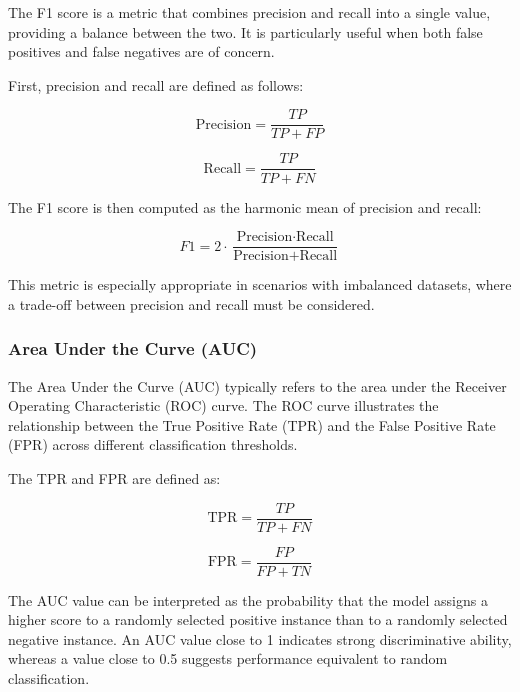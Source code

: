 \documentclass[ENG]{TFUOC}%
\begin{document}
The F1 score is a metric that combines precision and recall into a single value, providing a balance between the two. It is particularly useful when both false positives and false negatives are of concern.

First, precision and recall are defined as follows:

\begin{equation}
\text{Precision} = \frac{TP}{TP + FP}
\end{equation}

\begin{equation}
\text{Recall} = \frac{TP}{TP + FN}
\end{equation}

The F1 score is then computed as the harmonic mean of precision and recall:

\begin{equation}
F1 = 2 \cdot \frac{\text{Precision} \cdot \text{Recall}}{\text{Precision} + \text{Recall}}
\end{equation}

This metric is especially appropriate in scenarios with imbalanced datasets, where a trade-off between precision and recall must be considered.

\subsubsection{Area Under the Curve (AUC)}

The Area Under the Curve (AUC) typically refers to the area under the Receiver Operating Characteristic (ROC) curve. The ROC curve illustrates the relationship between the True Positive Rate (TPR) and the False Positive Rate (FPR) across different classification thresholds.

The TPR and FPR are defined as:

\begin{equation}
\text{TPR} = \frac{TP}{TP + FN}
\end{equation}

\begin{equation}
\text{FPR} = \frac{FP}{FP + TN}
\end{equation}

The AUC value can be interpreted as the probability that the model assigns a higher score to a randomly selected positive instance than to a randomly selected negative instance. An AUC value close to 1 indicates strong discriminative ability, whereas a value close to 0.5 suggests performance equivalent to random classification.
\end{document}
